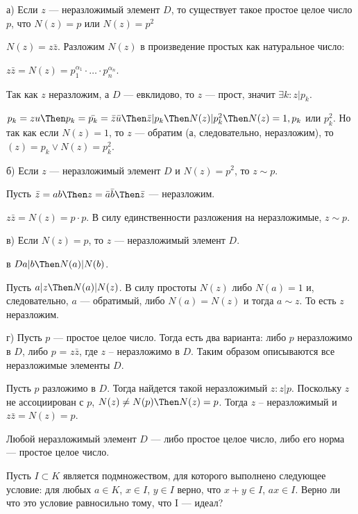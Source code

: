 \begin{solution}
	а) Если \(z\) --- неразложимый элемент \(D\), то существует такое простое целое число \(p\), что \(N(z) = p\) или \(N(z) = p^2\)
	
	\(N(z) = z\bar{z}\). Разложим \(N(z)\) в произведение простых как натуральное число:
	
	\(z\bar{z} = N(z) = p_1^{\alpha_1} \cdot \ldots \cdot p_n^{\alpha_n}\).
	
	Так как \(z\) неразложим, а \(D\) --- евклидово, то \(z\) --- прост, значит \(\exists k: z | p_k\).
	
	\(p_k = zu \Then p_k = \bar{p_k} = \bar{z}\bar{u} \Then \bar{z} | p_k \Then N(z) | p_k^2 \Then N(z) = 1, p_k\) или \(p_k^2\). Но так как если \(N(z) = 1\), то \(z\) --- обратим (а, следовательно, неразложим), то \((z) = p_k \lor N(z) = p_k^2\).
	
	б) Если \(z\) --- неразложимый элемент \(D\) и \(N(z) = p^2\), то \(z \sim p\).
	
	Пусть \(\bar{z} = ab \Then z = \bar{a} \bar{b} \Then \bar{z}\) --- неразложим.
	
	\(z \bar{z} = N(z) = p \cdot p\). В силу единственности разложения на неразложимые, \(z \sim p\).
	
	в) Если \(N(z) = p\), то \(z\) --- неразложимый элемент \(D\).
	
	в \(D a|b \Then N(a) | N(b)\).
	
	Пусть \(a | z \Then N(a) | N(z)\). В силу простоты \(N(z)\) либо \(N(a) = 1\) и, следовательно, \(a\) --- обратимый, либо \(N(a) = N(z)\) и тогда \(a \sim z\). То есть \(z\) неразложим.
	
	г) Пусть \(p\) --- простое целое число. Тогда есть два варианта: либо \(p\) неразложимо в \(D\), либо \(p\) = \(z\bar{z}\), где \(z\) -- неразложимо в \(D\). Таким образом описываются все неразложимые элементы \(D\).
	
	Пусть \(p\) разложимо в \(D\). Тогда найдется такой неразложимый \(z: z|p\). Поскольку \(z\) не ассоциирован с \(p\), \(N(z) \ne N(p) \Then N(z) = p\). Тогда \(z\) -- неразложимый и \(z\bar{z} = N(z) = p\).
	
	Любой неразложимый элемент \(D\) --- либо простое целое число, либо его норма --- простое целое число.
\end{solution}


\begin{problem}[15]
	Пусть $I \subset K$ является подмножеством, для которого выполнено следующее условие: для любых $a \in K$, $x \in I$, $y \in I$ верно, что $x + y \in I$, $ax \in I$. Верно ли что это условие равносильно тому, что I --- идеал?
\end{problem}

